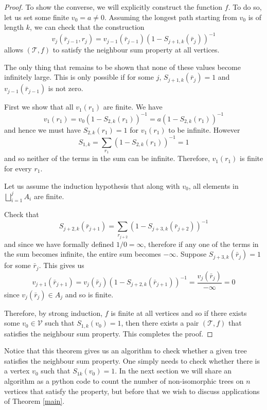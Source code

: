 \documentclass[11pt]{article}
\begin{document}
\begin{proof}
    To show the converse,  we will explicitly construct the function $f$. To do so, let us set some finite $v_0 = a\neq 0$. Assuming the longest path starting from $v_0$ is of length $k$, we can check that the construction $$v_j(\bar{r}_{j-1},r_j)=v_{j-1}(\bar{r}_{j-1})(1-S_{j+1,k}(\bar{r}_j))^{-1}$$ allows $(\mathcal T, f)$ to satisfy the neighbour sum property at all vertices. 
    
    The only thing that remains to be shown that none of these values become infinitely large. This is only possible if for some $j$, $S_{j+1,k}(\bar{r}_j)=1$ and $v_{j-1}(\bar{r}_{j-1})$ is not zero.

    First we show that all $v_1(r_1)$ are finite. We have
    $$v_1(r_1)=v_0(1-S_{2,k}(r_1))^{-1} = a(1-S_{2,k}(r_1))^{-1}$$
    and hence we must have $S_{2,k}(r_1)=1$ for $v_1(r_1)$ to be infinite. However
    $$S_{1,k} = \sum_{r_1}(1-S_{2,k}(r_1))^{-1} = 1$$
    and so neither of the terms in the sum can be infinite. Therefore, $v_1(r_1)$ is finite for every $r_1$.

    
    Let us assume the induction hypothesis that along with $v_0$, all elements in $\bigsqcup_{i=1}^j A_i$ are finite.
    
    Check that
    $$S_{j+2,k}(\bar{r}_{j+1}) = \sum_{r_{j+2}}\left(1-S_{j+3,k}(\bar{r}_{j+2})\right)^{-1}$$
    and since we have formally defined $1/0=\infty$, therefore if any one of the terms in the sum becomes infinite, the entire sum becomes $-\infty$. Suppose $S_{j+3,k}(\bar{r}_j)=1$ for some $\bar{r}_j$. This gives us $$
    v_{j+1}(\bar{r}_{j+1}) = v_{j}(\bar{r}_{j})(1-S_{j+2,k}(\bar{r}_{j+1}))^{-1} = \dfrac{v_{j}(\bar{r}_{j})}{-\infty}=0$$
    since $v_{j}(\bar{r}_j)\in A_j$ and so is finite.

    Therefore, by strong induction, $f$ is finite at all vertices and so if there exists some $v_0\in\mathcal{V}$ such that $S_{1,k}(v_0)=1$, then there exists a pair $(\mathcal{T}, f)$ that satisfies the neighbour sum property. This completes the proof.
\end{proof}

Notice that this theorem gives us an algorithm to check whether a given tree satisfies the neighbour sum property. One simply needs to check whether there is a vertex $v_0$ such that $S_{1k}(v_0)=1$. In the next section we will share an algorithm as a python code to count the number of non-isomorphic trees on $n$ vertices that satisfy the property, but before that we wish to discuss applications of Theorem \ref{main}.
\end{document}
